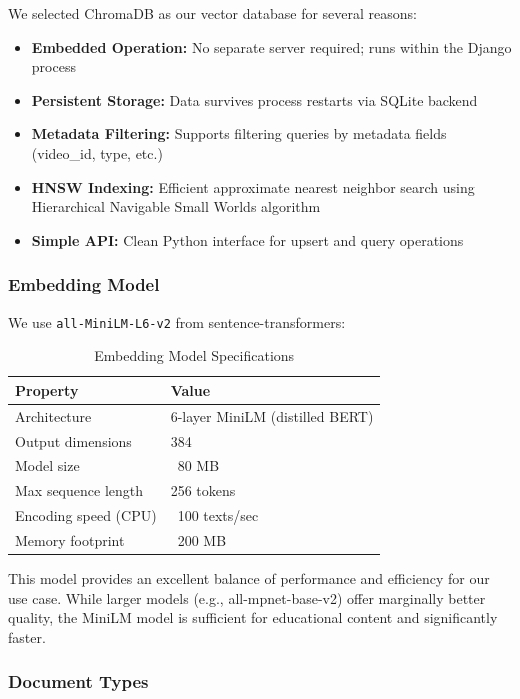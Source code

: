 We selected ChromaDB as our vector database for several reasons:

\begin{itemize}
    \item \textbf{Embedded Operation:} No separate server required; runs within the Django process
    \item \textbf{Persistent Storage:} Data survives process restarts via SQLite backend
    \item \textbf{Metadata Filtering:} Supports filtering queries by metadata fields (video\_id, type, etc.)
    \item \textbf{HNSW Indexing:} Efficient approximate nearest neighbor search using Hierarchical Navigable Small Worlds algorithm
    \item \textbf{Simple API:} Clean Python interface for upsert and query operations
\end{itemize}

\subsubsection{Embedding Model}

We use \texttt{all-MiniLM-L6-v2} from sentence-transformers:

\begin{table}[H]
    \centering
    \caption{Embedding Model Specifications}
    \begin{tabular}{@{}ll@{}}
        \toprule
        \textbf{Property} & \textbf{Value} \\ \midrule
        Architecture & 6-layer MiniLM (distilled BERT) \\
        Output dimensions & 384 \\
        Model size & ~80 MB \\
        Max sequence length & 256 tokens \\
        Encoding speed (CPU) & ~100 texts/sec \\
        Memory footprint & ~200 MB \\ \bottomrule
    \end{tabular}
\end{table}

This model provides an excellent balance of performance and efficiency for our use case. While larger models (e.g., all-mpnet-base-v2) offer marginally better quality, the MiniLM model is sufficient for educational content and significantly faster.

\subsubsection{Document Types}

